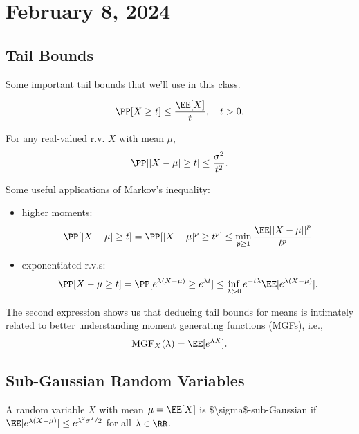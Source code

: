 \section{February 8, 2024}

\subsection{Tail Bounds}

Some important tail bounds that we'll use in this class.

\begin{theorem}

\[\PP[X \geq t]\leq \frac{\EE[X]}{t}, \quad t > 0.\] 
\end{theorem}

\begin{theorem}

For any real-valued r.v. $X$ with mean $\mu$, 
\[\PP[\vert X-\mu\vert \geq t]\leq \frac{\sigma^2}{t^2}.\] 
\end{theorem}

Some useful applications of Markov's inequality: 
\begin{itemize}
	\item higher moments: 
		\[\PP[\vert X-\mu\vert\geq t] = \PP[\vert X-\mu\vert^p \geq t^p] \leq \min_{p\geq 1}\frac{\EE[\vert X-\mu\vert]^p}{t^p}\] 
	\item exponentiated r.v.s: 
	\[\PP[X - \mu\geq t] = \PP[e^{\lambda(X-\mu)}\geq e^{\lambda t}] \leq \inf_{\lambda > 0}e^{-t\lambda} \EE[e^{\lambda(X-\mu)}].\] 
\end{itemize}
The second expression shows us that deducing tail bounds for means is intimately related to better understanding \ac{moment generating functions} (MGFs), i.e., 
\[\text{MGF}_X(\lambda) = \EE[e^{\lambda X}].\] 

\subsection{Sub-Gaussian Random Variables}

\begin{definition}

A random variable $X$ with mean $\mu = \EE[X]$ is \ac{$\sigma$-sub-Gaussian} if $\EE[e^{\lambda(X - \mu)}] \leq e^{\lambda^2\sigma^2 / 2}$ for all $\lambda\in \RR$. 
\end{definition}

